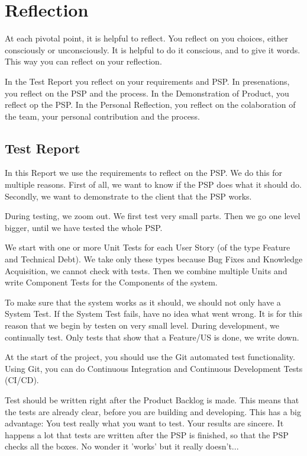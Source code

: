 \documentclass[10pt]{report}
\begin{document}
\newpage

\chapter{Reflection}

At each pivotal point, it is helpful to reflect. You reflect on you choices, either consciously or unconsciously. It is helpful to do it conscious, and to give it words. This way you can reflect on your reflection.

In the Test Report you reflect on your requirements and PSP. In presenations, you reflect on the PSP and the process. In the Demonstration of Product, you reflect op the PSP. In the Personal Reflection, you reflect on the colaboration of the team, your personal contribution and the process.

\medskip
\minitoc

\newpage

\section{Test Report}

In this Report we use the requirements to reflect on the PSP. We do this for multiple reasons. First of all, we want to know if the PSP does what it should do. Secondly, we want to demonstrate to the client that the PSP works. 

During testing, we zoom out. We first test very small parts. Then we go one level bigger, until we have tested the whole PSP.

We start with one or more Unit Tests for each User Story (of the type Feature and Technical Debt). We take only these types because Bug Fixes and Knowledge Acquisition, we cannot check with tests. Then we combine multiple Units and write Component Tests for the Components of the system. 

To make sure that the system works as it should, we should not only have a System Test. If the System Test fails, have no idea what went wrong. It is for this reason that we begin by testen on very small level. During development, we continually test. Only tests that show that a Feature/US is done, we write down.

At the start of the project, you should use the Git automated test functionality. Using Git, you can do Continuous Integration and Continuous Development Tests (CI/CD).

Test should be written right after the Product Backlog is made. This means that the tests are already clear, before you are building and developing. This has a big advantage: You test really what you want to test. Your results are sincere. It happens a lot that tests are written after the PSP is finished, so that the PSP checks all the boxes. No wonder it 'works' but it really doesn't...
\end{document}
